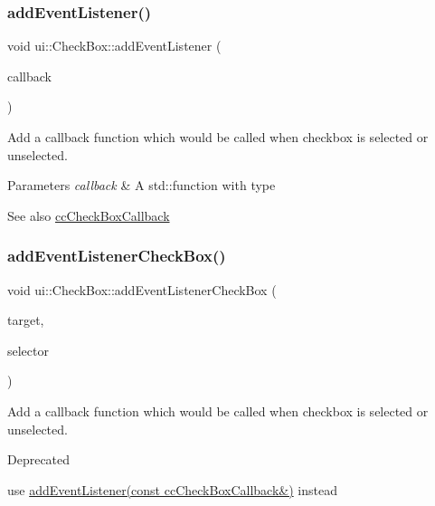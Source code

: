 \subsubsection{\texorpdfstring{add\+Event\+Listener()}{addEventListener()}\hspace{0.1cm}{\footnotesize\ttfamily [2/2]}}
{\footnotesize\ttfamily void ui\+::\+Check\+Box\+::add\+Event\+Listener (\begin{DoxyParamCaption}\item[{const \hyperlink{classui_1_1CheckBox_ad210762967d1b444f5cf94f5e7450c56}{cc\+Check\+Box\+Callback} \&}]{callback }\end{DoxyParamCaption})}

Add a callback function which would be called when checkbox is selected or unselected. 
\begin{DoxyParams}{Parameters}
{\em callback} & A std\+::function with type \\
\hline
\end{DoxyParams}
\begin{DoxySeeAlso}{See also}
{\ttfamily \hyperlink{classui_1_1CheckBox_ad210762967d1b444f5cf94f5e7450c56}{cc\+Check\+Box\+Callback}} 
\end{DoxySeeAlso}
\mbox{\label{classui_1_1CheckBox_aaaa8d3ac0fe69b257c7087e58b504364}} 
\subsubsection{\texorpdfstring{add\+Event\+Listener\+Check\+Box()}{addEventListenerCheckBox()}\hspace{0.1cm}{\footnotesize\ttfamily [1/2]}}
{\footnotesize\ttfamily void ui\+::\+Check\+Box\+::add\+Event\+Listener\+Check\+Box (\begin{DoxyParamCaption}\item[{\hyperlink{classRef}{Ref} $\ast$}]{target,  }\item[{S\+E\+L\+\_\+\+Selected\+State\+Event}]{selector }\end{DoxyParamCaption})}

Add a callback function which would be called when checkbox is selected or unselected. \begin{DoxyRefDesc}{Deprecated}
\item[\hyperlink{deprecated__deprecated000141}{Deprecated}]use {\ttfamily \hyperlink{classui_1_1CheckBox_a11c1b9cd5d7314a980f994977f960822}{add\+Event\+Listener(const cc\+Check\+Box\+Callback\&)}} instead \end{DoxyRefDesc}


